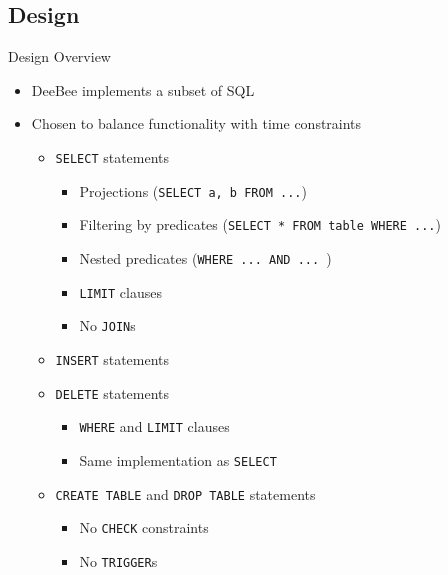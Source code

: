 \documentclass{beamer}
\begin{document}
\subsection{Design}
\begin{frame}{Design Overview} 
  \begin{itemize}
    \item DeeBee implements a subset of SQL \pause
    \item Chosen to balance functionality with time constraints \pause
    \begin{itemize}
      \item \texttt{SELECT} statements  \pause
        \begin{itemize}
            \item Projections (\texttt{SELECT a, b FROM ...})  \pause
            \item Filtering by predicates (\texttt{SELECT * FROM table WHERE ...})  \pause
            \item Nested predicates  (\texttt{WHERE ... AND ... })  \pause
            \item \texttt{LIMIT} clauses  \pause
            \item No \texttt{JOIN}s  \pause
          \end{itemize}
      \item \texttt{INSERT} statements  \pause
      \item \texttt{DELETE} statements  \pause
        \begin{itemize}
          \item \texttt{WHERE} and \texttt{LIMIT} clauses  \pause
          \item Same implementation as \texttt{SELECT}  \pause
        \end{itemize}
      \item \texttt{CREATE TABLE} and \texttt{DROP TABLE} statements  \pause
      \begin{itemize}
        \item No \texttt{CHECK} constraints  \pause
        \item No \texttt{TRIGGER}s 
      \end{itemize}
    \end{itemize}
  \end{itemize}
\end{frame}
\end{document}
